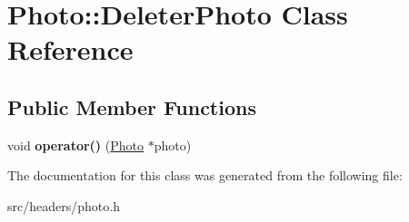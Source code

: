 \hypertarget{class_photo_1_1_deleter_photo}{\section{Photo\-:\-:Deleter\-Photo Class Reference}
\label{class_photo_1_1_deleter_photo}
}
\subsection*{Public Member Functions}
\begin{DoxyCompactItemize}
\item 
\hypertarget{class_photo_1_1_deleter_photo_a5c6d09f36578b4f78ded7c6938fbfea0}{void {\bfseries operator()} (\hyperlink{class_photo}{Photo} $\ast$photo)}\label{class_photo_1_1_deleter_photo_a5c6d09f36578b4f78ded7c6938fbfea0}

\end{DoxyCompactItemize}


The documentation for this class was generated from the following file\-:\begin{DoxyCompactItemize}
\item 
src/headers/photo.\-h\end{DoxyCompactItemize}
